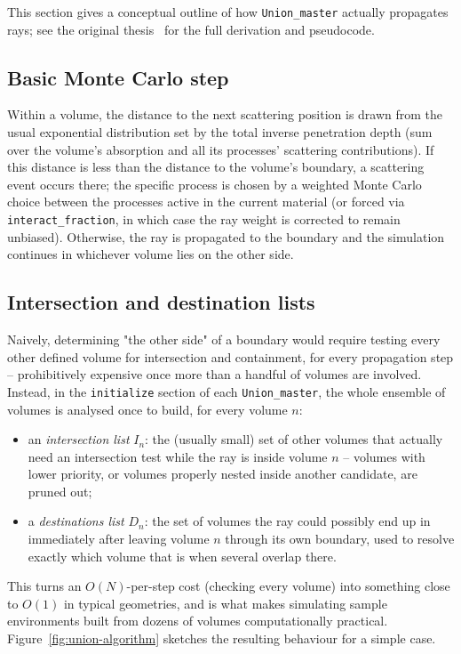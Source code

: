 This section gives a conceptual outline of how \texttt{Union\_master}
actually propagates rays; see the original thesis~\cite{union_thesis} for
the full derivation and pseudocode.

\subsection{Basic Monte Carlo step}
Within a volume, the distance to the next scattering position is drawn from
the usual exponential distribution set by the total inverse penetration
depth (sum over the volume's absorption and all its processes' scattering
contributions). If this distance is less than the distance to the volume's
boundary, a scattering event occurs there; the specific process is chosen
by a weighted Monte Carlo choice between the processes active in the
current material (or forced via \texttt{interact\_fraction}, in which case
the ray weight is corrected to remain unbiased). Otherwise, the ray is
propagated to the boundary and the simulation continues in whichever volume
lies on the other side.

\subsection{Intersection and destination lists}
\label{sec:union-lists}
Naively, determining "the other side" of a boundary would require testing
every other defined volume for intersection and containment, for every
propagation step -- prohibitively expensive once more than a handful of
volumes are involved. Instead, in the \texttt{initialize} section of each
\texttt{Union\_master}, the whole ensemble of volumes is analysed once to
build, for every volume $n$:
\begin{itemize}
\item an \emph{intersection list} $I_n$: the (usually small) set of other
  volumes that actually need an intersection test while the ray is inside
  volume $n$ -- volumes with lower priority, or volumes properly nested
  inside another candidate, are pruned out;
\item a \emph{destinations list} $D_n$: the set of volumes the ray could
  possibly end up in immediately after leaving volume $n$ through its own
  boundary, used to resolve exactly which volume that is when several
  overlap there.
\end{itemize}
This turns an $O(N)$-per-step cost (checking every volume) into something
close to $O(1)$ in typical geometries, and is what makes simulating
sample environments built from dozens of volumes computationally
practical. Figure~\ref{fig:union-algorithm} sketches the resulting behaviour
for a simple case.

